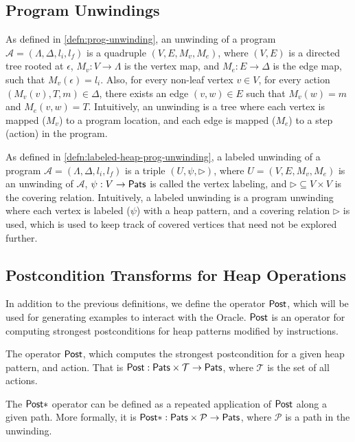 \subsection{Program Unwindings}
As defined in \autoref{defn:prog-unwinding}, an unwinding of a program $\mathcal{A} = (\Lambda, \Delta, l_i, l_f)$ is a quadruple $(V, E, M_v, M_e)$, where $(V, E)$ is a directed tree rooted at $\epsilon$, $M_v : V \rightarrow \Lambda$ is the vertex map, and $M_e : E \rightarrow \Delta$ is the edge map, such that $M_v(\epsilon) = l_i$. Also, for every non-leaf vertex $v \in V$, for every action $(M_v(v), T, m) \in \Delta$, there exists an edge $(v,w) \in E$ such that $M_v(w) = m$ and $M_e(v,w) = T$. Intuitively, an unwinding is a tree where each vertex is mapped ($M_v$) to a program location, and each edge is mapped ($M_e$) to a step (action) in the program.

As defined in \autoref{defn:labeled-heap-prog-unwinding}, a labeled unwinding of a program $\mathcal{A} = (\Lambda, \Delta, l_i, l_f)$ is a triple $(U, \psi, \rhd)$, where $U = (V, E, M_v, M_e)$ is an unwinding of $\mathcal{A}$, $\psi : V \to \mathsf{Pats}$ is called the vertex labeling, and $\rhd \subseteq V \times V$ is the covering relation. Intuitively, a labeled unwinding is a program unwinding where each vertex is labeled ($\psi$) with a heap pattern, and a covering relation $\rhd$ is used, which is used to keep track of covered vertices that need not be explored further.

\subsection{Postcondition Transforms for Heap Operations}
In addition to the previous definitions, we define the operator $\mathsf{Post}$, which will be used for generating examples to interact with the Oracle. $\mathsf{Post}$ is an operator for computing strongest postconditions for heap patterns modified by \lang instructions.

\begin{defn}
  \label{defn:heap-post-transforms}
  The operator $\mathsf{Post}$, which computes the strongest postcondition for a given heap pattern, and action. That is $\mathsf{Post} : \mathsf{Pats} \times \mathcal{T} \to \mathsf{Pats}$, where $\mathcal{T}$ is the set of all actions.

  The $\mathsf{Post}{*}$ operator can be defined as a repeated application of $\mathsf{Post}$ along a given path. More formally, it is $\mathsf{Post}{*} : \mathsf{Pats} \times \mathcal{P} \to \mathsf{Pats}$, where $\mathcal{P}$ is a path in the unwinding.
\end{defn}

